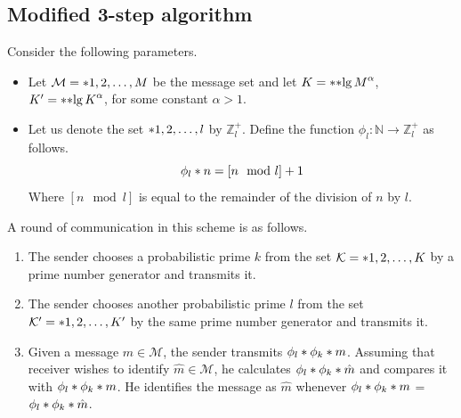 \subsection{Modified 3-step algorithm}
Consider the following parameters.
\begin{itemize}
	\item Let \(\mathcal{M} = \set{1,2, \dots, M }\) be the message set and let \(K = \ceil{\bracket{\lg M}^{\alpha}}\), \(K' = \ceil{\bracket{\lg K}^{\alpha}}\),  for some constant \(\alpha > 1\). 
	\item Let us denote the set \(\set{1,2, \dots, l }\) by \(\mathbb{Z}^+_l\).  Define the function \(\phi_l: \mathbb{N} \to \mathbb{Z}_{l}^+ \) as follows.
	\begin{equation}
		\func{\phi_l}{n}= [n \mod l] + 1
	\end{equation}
	Where \([n \mod l]\) is equal to the remainder of the division of \(n\) by \(l\).
\end{itemize}

A round of communication in this scheme is as follows.
\begin{enumerate}
	\item The sender chooses a probabilistic prime \(k\) from the set \(\mathcal{K} = \set{1,2,\dots, K}\) by a prime number generator and transmits it.
	\item The sender chooses another probabilistic prime \(l\) from the set \( \mathcal{K}' = \set{1,2,\dots, K'}\) by the same prime number generator and transmits it.
	\item Given a message \(m \in \mathcal{M}\), the sender transmits \(\func{\phi_l}{\func{\phi_k}{m}}\). Assuming that receiver wishes to identify \(\hat{m} \in \mathcal{M}\), he calculates \(\func{\phi_l}{\func{\phi_k}{\hat{m}}}\) and compares it with \(\func{\phi_l}{\func{\phi_k}{m}}\). He identifies the message as \(\hat{m}\) whenever \(\func{\phi_l}{\func{\phi_k}{m}}\) = \(\func{\phi_l}{\func{\phi_k}{\hat{m}}}\).
\end{enumerate}


